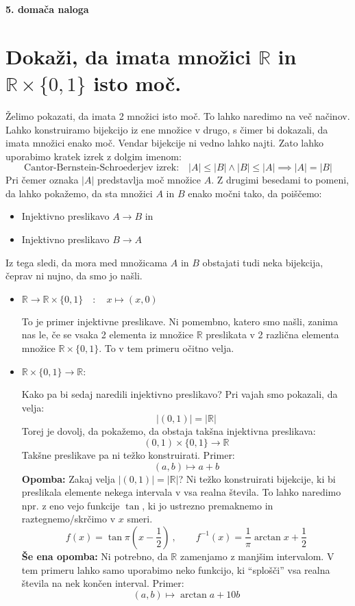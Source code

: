 \documentclass[a4paper, 12pt]{article}
\newcommand{\RR}{\ensuremath{\mathbb{R}}}
\begin{document}
    \begin{center}
        \Large\textbf{5. domača naloga}
    \end{center}

    \section{Dokaži, da imata množici $\RR$ in $\RR \times \{0, 1\}$ isto moč.}
    Želimo pokazati, da imata 2 množici isto moč. To lahko naredimo na več načinov. Lahko konstruiramo bijekcijo iz ene množice v drugo, s čimer bi dokazali, da imata množici enako moč. Vendar bijekcije ni vedno lahko najti. Zato lahko uporabimo kratek izrek z dolgim imenom:
    \[
    \text{Cantor-Bernstein-Schroederjev izrek:}\quad
    |A| \leq |B| \land |B| \leq |A| \implies |A| = |B|
    \]     
    Pri čemer oznaka $|A|$ predstavlja moč množice $A$. Z drugimi besedami to pomeni, da lahko pokažemo, da sta množici $A$ in $B$ enako močni tako, da poiščemo:
    \begin{itemize}
        \item Injektivno preslikavo $A \to B$ in
        \item Injektivno preslikavo $B \to A$
    \end{itemize}
    Iz tega sledi, da mora med množicama $A$ in $B$ obstajati tudi neka bijekcija, čeprav ni nujno, da smo jo našli.
    
    \begin{itemize}
        \item $\RR \to \RR \times \{0, 1\} \quad :\quad x \mapsto (x, 0)$
        
        To je primer injektivne preslikave. Ni pomembno, katero smo našli, zanima nas le, če se vsaka 2 elementa iz množice $\RR$ preslikata v 2 različna elementa množice $\RR \times \{0, 1\}$. To v tem primeru očitno velja.
        \item $\RR \times \{0, 1\} \to \RR$:
        
        Kako pa bi sedaj naredili injektivno preslikavo? Pri vajah smo pokazali, da velja:
        \[
        |(0, 1)| = |\RR|
        \]
        Torej je dovolj, da pokažemo, da obstaja takšna injektivna preslikava:
        \[
        (0, 1) \times \{0, 1\} \to \RR
        \]
        Takšne preslikave pa ni težko konstruirati. Primer:
        \[
        (a, b) \mapsto a + b
        \]
        \textbf{Opomba:} Zakaj velja $|(0, 1)| = |\RR|$? Ni težko konstruirati bijekcije, ki bi preslikala elemente nekega intervala v vsa realna števila. To lahko naredimo npr. z eno vejo funkcije $\tan$, ki jo ustrezno premaknemo in raztegnemo/skrčimo v $x$ smeri.
        \[
        f(x) = \tan \pi (x - \frac{1}{2})\ ,\qquad
        f^{-1}(x) = \frac{1}{\pi} \arctan x + \frac{1}{2}
        \]
        \textbf{Še ena opomba:} Ni potrebno, da $\RR$ zamenjamo z manjšim intervalom. V tem primeru lahko samo uporabimo neko funkcijo, ki ``splošči'' vsa realna števila na nek končen interval. Primer:
        \[
        (a, b) \mapsto \arctan a + 10 b
        \]
    \end{itemize}
    
\end{document}
